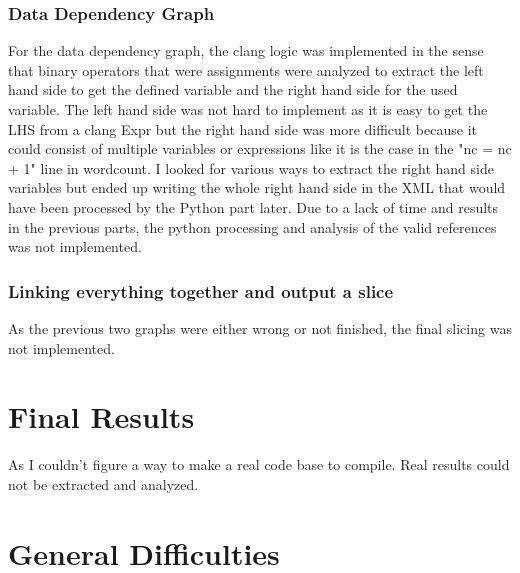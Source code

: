 \documentclass[conference,compsoc]{IEEEtran}
\begin{document}
\subsubsection{Data Dependency Graph}
For the data dependency graph, the clang logic was implemented in the sense that binary operators that were assignments were analyzed to extract
the left hand side to get the defined variable and the right hand side for the used variable. The left hand side was not hard to implement as it is easy to get the LHS from
a clang Expr but the right hand side was more difficult because it could consist of multiple variables or expressions like it is the case in the "nc = nc + 1" line in wordcount.
I looked for various ways to extract the right hand side variables but ended up writing the whole right hand side in the XML that would have been processed by the Python part later.
Due to a lack of time and results in the previous parts, the python processing and analysis of the valid references was not implemented.

\subsubsection{Linking everything together and output a slice}
As the previous two graphs were either wrong or not finished, the final slicing was not implemented.


\section{Final Results}
As I couldn't figure a way to make a real code base to compile. Real results could not be extracted and analyzed.


\section{General Difficulties}
\end{document}
